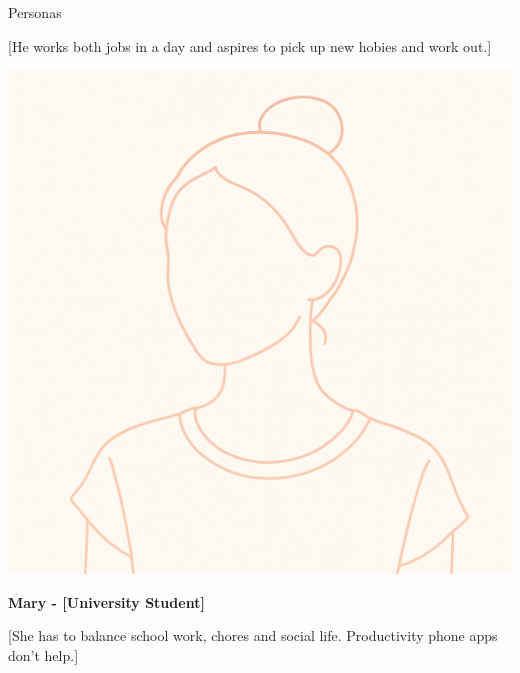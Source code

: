 \documentclass[final]{beamer}
\newlength{\colwidth}
\begin{document}
\begin{frame}[t]
\begin{columns}[t]
\begin{column}{\colwidth}
\begin{block}{Personas}
\begin{minipage}[t]{0.65\linewidth}
      [He works both jobs in a day and aspires to pick up new hobies and work out.]
    \end{minipage}
    
    \vspace{0.4cm}
    
    \begin{minipage}[t]{0.3\linewidth}
      \centering
      \includegraphics[width=0.8\linewidth]{Mary.png}
    \end{minipage}
    \hfill
    \begin{minipage}[t]{0.65\linewidth}
      \textbf{Mary - [University Student]}
      
      [She has to balance school work, chores and social life. Productivity phone apps don't help.]
    \end{minipage}

  \end{block}


\end{column}
\end{columns}
\end{frame}
\end{document}
